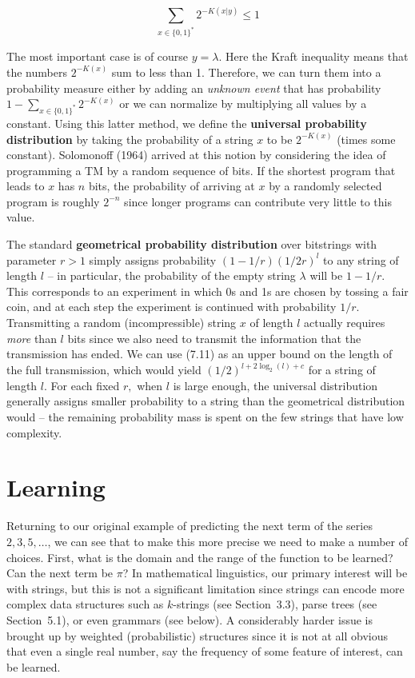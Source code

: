 \begin{equation}
\sum_{x\in\{0,1\}^*} 2^{-K(x|y)} \leq 1 
\end{equation}

\smallskip\noindent The most important case is of course $y=\lambda$. Here the
Kraft inequality means that the numbers $2^{-K(x)}$ sum to less than 1.
Therefore, we can turn them into a probability measure either by adding an
{\it unknown event} that has probability $1-\sum_{x\in\{0,1\}^*} 2^{-K(x)}$ or
we can normalize by multiplying all values by a constant. Using this latter
method, we define the {\bf universal probability distribution} by taking the
probability of a string $x$ to be $2^{-K(x)}$ (times some
constant). Solomonoff (1964)
arrived at this notion by considering the idea of programming a TM by a random
sequence of bits. If the shortest program that leads to $x$ has $n$ bits, the
probability of arriving at $x$ by a randomly selected program is roughly
$2^{-n}$ since longer programs can contribute very little to this value.

The standard {\bf geometrical probability distribution} over bitstrings with
parameter $r>1$ simply
assigns probability $(1-1/r)(1/2r)^l$ to any string of length $l$ -- in
particular, the probability of the empty string $\lambda$ will be $1-1/r$.
This corresponds to an experiment in which 0s and 1s are chosen by tossing a
fair coin, and at each step the experiment is continued with probability
$1/r$. Transmitting a random (incompressible) string $x$ of length $l$
actually requires {\it more} than $l$ bits since we also need to transmit the
information that the transmission has ended. We can use (7.11) as an upper
bound on the length of the full transmission, which would yield
$(1/2)^{l+2\log_2(l)+c}$ for a string of length $l$. For each fixed $r,$ when
$l$ is large enough, the universal distribution generally assigns smaller
probability to a string than the geometrical distribution would -- the 
remaining probability mass is spent on the few strings that have low
complexity. 

\section{Learning}

Returning to our original example of predicting the next term of the series
$2,3,5,\ldots$, we can see that to make this more precise we need to make a
number of choices. First, what is the domain and the range of the function to
be learned? Can the next term be $\pi$? In mathematical linguistics, our
primary interest will be with strings, but this is not a significant
limitation since strings can encode more complex data structures such as
$k$-strings (see Section~3.3), parse trees (see Section~5.1), or even grammars
(see below).  A considerably harder issue is brought up by weighted
(probabilistic) structures since it is not at all obvious that even a single
real number, say the frequency of some feature of interest, can be learned.

